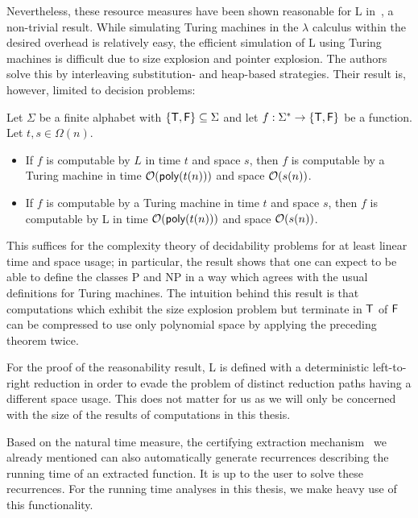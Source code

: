 Nevertheless, these resource measures have been shown reasonable for L in~\cite{ForsterKunzeRoth:2019:wcbv-Reasonable}, a non-trivial result. While simulating Turing machines in the $\lambda$ calculus within the desired overhead is relatively easy, the efficient simulation of L using Turing machines is difficult due to size explosion and pointer explosion. The authors solve this by interleaving substitution- and heap-based strategies.
Their result is, however, limited to decision problems:
\begin{theorem}
  Let $\Sigma$ be a finite alphabet with $\{\mathsf{T}, \mathsf{F}\} \subseteq \Sigma$ and let $f : \Sigma^* \rightarrow \{\mathsf{T}, \mathsf{F}\}$ be a function. Let $t, s \in \Omega(n)$. 
  \begin{itemize}
    \item If $f$ is computable by $L$ in time $t$ and space $s$, then $f$ is computable by a Turing machine in time $\mathcal{O}{(\textsf{poly}(t(n)))}$ and space $\mathcal{O}{(s(n))}$.
    \item If $f$ is computable by a Turing machine in time $t$ and space $s$, then $f$ is computable by L in time $\mathcal{O}{(\textsf{poly}(t(n)))}$ and space $\mathcal{O}{(s(n))}$. 
  \end{itemize}
\end{theorem}
This suffices for the complexity theory of decidability problems for at least linear time and space usage; in particular, the result shows that one can expect to be able to define the classes \textsf{P} and \textsf{NP} in a way which agrees with the usual definitions for Turing machines. 
The intuition behind this result is that computations which exhibit the size explosion problem but terminate in $\mathsf{T}$ of $\mathsf{F}$ can be compressed to use only polynomial space by applying the preceding theorem twice.

\begin{remark}
  For the proof of the reasonability result, L is defined with a deterministic left-to-right reduction in order to evade the problem of distinct reduction paths having a different space usage. This does not matter for us as we will only be concerned with the size of the results of computations in this thesis.
\end{remark}

Based on the natural time measure, the certifying extraction mechanism~\cite{ForsterKunze:2019:Certifying-extraction} we already mentioned can also automatically generate recurrences describing the running time of an extracted function. It is up to the user to solve these recurrences.
For the running time analyses in this thesis, we make heavy use of this functionality.

